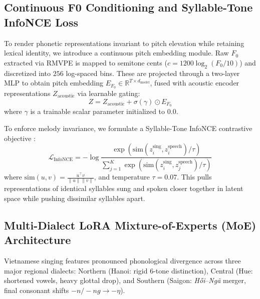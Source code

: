 \subsection{Continuous F0 Conditioning and Syllable-Tone InfoNCE Loss}
To render phonetic representations invariant to pitch elevation while retaining lexical identity, we introduce a continuous pitch embedding module. Raw $F_0$ extracted via RMVPE \cite{zhou2023rmvpe} is mapped to semitone cents ($c = 1200 \log_2(F_0 / 10)$) and discretized into $256$ log-spaced bins. These are projected through a two-layer MLP to obtain pitch embedding $E_{F_0} \in \mathbb{R}^{T \times d_{\text{model}}}$, fused with acoustic encoder representations $Z_{\text{acoustic}}$ via learnable gating:
\begin{equation}
Z = Z_{\text{acoustic}} + \sigma(\gamma) \odot E_{F_0}
\end{equation}
where $\gamma$ is a trainable scalar parameter initialized to $0.0$.

To enforce melody invariance, we formulate a Syllable-Tone InfoNCE contrastive objective \cite{oord2018infonce}:
\begin{equation}
\mathcal{L}_{\text{InfoNCE}} = -\log \frac{\exp(\text{sim}(z_i^{\text{sing}}, z_i^{\text{speech}}) / \tau)}{\sum_{j=1}^K \exp(\text{sim}(z_i^{\text{sing}}, z_j^{\text{speech}}) / \tau)}
\end{equation}
where $\text{sim}(u, v) = \frac{u^\top v}{\|u\| \|v\|}$, and temperature $\tau = 0.07$. This pulls representations of identical syllables sung and spoken closer together in latent space while pushing dissimilar syllables apart.

\subsection{Multi-Dialect LoRA Mixture-of-Experts (MoE) Architecture}
Vietnamese singing features pronounced phonological divergence across three major regional dialects: Northern (Hanoi: rigid 6-tone distinction), Central (Hue: shortened vowels, heavy glottal drop), and Southern (Saigon: \textit{H\H{o}i}--\textit{Ng\~a} merger, final consonant shifts $-n/-ng \to -\eta$). 

